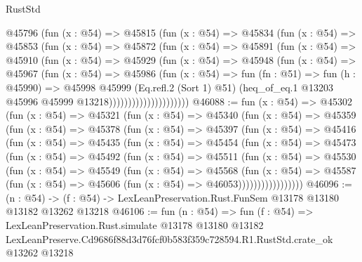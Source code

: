 \begin{lexlean}{RustStd}
\begin{coremodule}
                    @45796
                      (fun (x : @54) =>
                      @45815
                        (fun (x : @54) =>
                        @45834
                          (fun (x : @54) =>
                          @45853
                            (fun (x : @54) =>
                            @45872
                              (fun (x : @54) =>
                              @45891
                                (fun (x : @54) =>
                                @45910
                                  (fun (x : @54) =>
                                  @45929
                                    (fun (x : @54) =>
                                    @45948
                                      (fun (x : @54) =>
                                      @45967
                                        (fun (x : @54) =>
                                        @45986
                                          (fun (x : @54) =>
                                          fun (fn : @51) =>
                                          fun (h : @45990) =>
                                          @45998
                                            @45999
                                            (Eq.refl.{2} (Sort 1) @51)
                                            (heq_of_eq.{1}
                                              @13203
                                              @45996
                                              @45999
                                              @13218)))))))))))))))))))))
@46088 := fun (x : @54) =>
  @45302
    (fun (x : @54) =>
    @45321
      (fun (x : @54) =>
      @45340
        (fun (x : @54) =>
        @45359
          (fun (x : @54) =>
          @45378
            (fun (x : @54) =>
            @45397
              (fun (x : @54) =>
              @45416
                (fun (x : @54) =>
                @45435
                  (fun (x : @54) =>
                  @45454
                    (fun (x : @54) =>
                    @45473
                      (fun (x : @54) =>
                      @45492
                        (fun (x : @54) =>
                        @45511
                          (fun (x : @54) =>
                          @45530
                            (fun (x : @54) =>
                            @45549
                              (fun (x : @54) =>
                              @45568
                                (fun (x : @54) =>
                                @45587
                                  (fun (x : @54) => @45606 (fun (x : @54) => @46053)))))))))))))))))
@46096 := (n : @54) ->
  (f : @54) -> LexLeanPreservation.Rust.FunSem @13178 @13180 @13182 @13262 @13218
@46106 := fun (n : @54) =>
  fun (f : @54) =>
  LexLeanPreservation.Rust.simulate
    @13178
    @13180
    @13182
    LexLeanPreserve.Cd9686f88d3d76fcf0b583f359c728594.R1.RustStd.crate_ok
    @13262
    @13218
\end{coremodule}
\end{lexlean}
